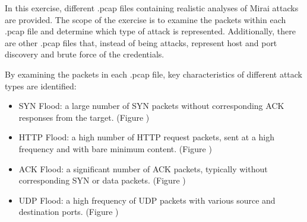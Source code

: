 In this exercise, different .pcap files containing realistic analyses of Mirai attacks are provided. The scope of the exercise is to examine the packets within each .pcap file and determine which type of attack is represented.
Additionally, there are other .pcap files that, instead of being attacks, represent host and port discovery and brute force of the credentials.

By examining the packets in each .pcap file, key characteristics of different attack types are identified:
\begin{itemize}
	\item SYN Flood: a large number of SYN packets without corresponding ACK responses from the target. (Figure )
	\item HTTP Flood: a high number of HTTP request packets, sent at a high frequency and with bare minimum content. (Figure )
	\item ACK Flood: a significant number of ACK packets, typically without corresponding SYN or data packets. (Figure )
	\item UDP Flood: a high frequency of UDP packets with various source and destination ports. (Figure )
\end{itemize}
